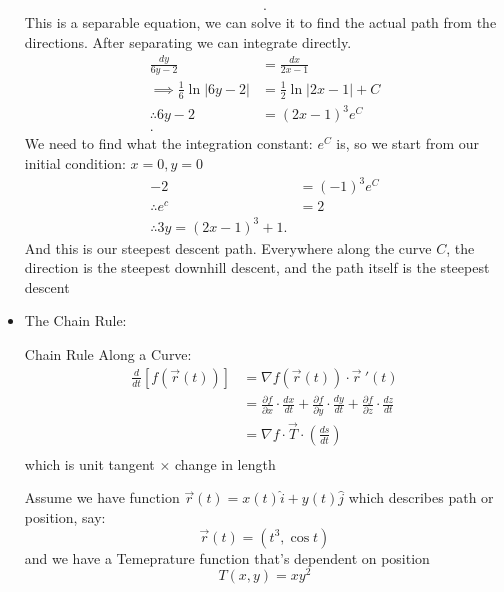 \begin{itemize}
\begin{example}
\begin{align*}
		.\end{align*}
		This is a separable equation, we can solve it to find the actual path from the directions. After separating we can integrate directly.
		\begin{align*}
			\frac{dy}{6y-2}&= \frac{dx}{2x-1} \\
			\implies \frac{1}{6} \ln|6y-2| &=  \frac{1}{2}\ln|2x-1| + C \\
			\therefore 6y-2 &= \left( 2x-1 \right) ^3e^C \\
		.\end{align*}
		We need to find what the integration constant: $e^C$ is, so we start from our initial condition: $x=0, y=0$
		\begin{align*}
			-2 &= \left( -1 \right) ^3e^C \\
			\therefore e^c &= 2 \\
			\therefore 3y = \left( 2x-1 \right) ^3+1
		.\end{align*}
		And this is our steepest descent path. Everywhere along the curve $C$, the direction is the steepest downhill descent, and the path itself is the steepest descent
	\end{example}
\item The Chain Rule:
	\begin{theorem}
		Chain Rule Along a Curve:
		\begin{align*}
			\frac{d}{dt}\left[ f\left(\vec{r}\left( t \right)  \right)  \right] &= \nabla f\left( \vec{r}\left( t \right)  \right) \cdot \vec{r}~'\left( t \right) \\
			&= \frac{\partial f}{\partial x} \cdot \frac{d x}{d t} +\frac{\partial f}{\partial y} \cdot \frac{d y}{d t} +\frac{\partial f}{\partial z} \cdot \frac{d z}{d t}  \\
			&= \nabla f \cdot  \vec{T} \cdot \left( \frac{ds}{dt} \right)  \\
		\end{align*}
		which is unit tangent $\times $ change in length
	\end{theorem}
	\begin{example}
		Assume we have function $\vec{r}\left( t \right)  = x\left( t \right) \hat{i} + y\left( t \right) \hat{j}$ which describes path or position, say:
		\begin{equation}
			\vec{r}\left( t \right)  = \left( t^3, \cos t \right) 
		\end{equation}
		and we have a Temeprature function that's dependent on position
		\begin{equation}
			T\left( x,y \right)  = xy^2

\end{equation}
\end{example}
\end{itemize}
